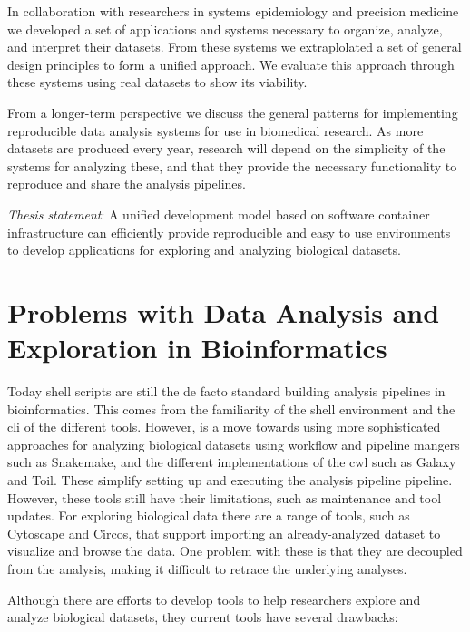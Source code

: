 In collaboration with researchers in systems epidemiology and precision
medicine we developed a set of applications and systems necessary to organize,
analyze, and interpret their datasets. From these systems we extraplolated a set
of general design principles to form a unified approach. We evaluate this
approach through these systems using real datasets to show its viability. 

From a longer-term perspective we discuss the general patterns for implementing
reproducible data analysis systems for use in biomedical research. As more
datasets are produced every year, research will depend on the simplicity of the
systems for analyzing these, and that they provide the necessary functionality
to reproduce and share the analysis pipelines. 

\emph{Thesis statement}:
A unified development model based on software container infrastructure can
efficiently provide reproducible and easy to use environments to develop
applications for exploring and analyzing biological datasets. 

\section{Problems with Data Analysis and Exploration in Bioinformatics}
Today shell scripts are still
the de facto standard building analysis pipelines in bioinformatics. This comes
from the familiarity of the shell environment and the \gls{cli} of the different
tools.  However, is a move towards using more sophisticated approaches for
analyzing biological datasets using workflow and pipeline mangers such as
Snakemake\cite{koster2012snakemake}, and the different implementations of the
\gls{cwl}\cite{cwl} such as Galaxy\cite{galaxy} and Toil\cite{toil}. These
simplify setting up and executing the analysis pipeline pipeline. However, these
tools still have their limitations, such as maintenance and tool updates.  For
exploring biological data there are a range of tools, such as
Cytoscape\cite{cytoscape} and Circos\cite{circos}, that support importing an
already-analyzed dataset to visualize and browse the data. One problem with
these is that they are decoupled from the analysis, making it difficult to
retrace the underlying analyses. 

Although there are efforts to develop tools to help researchers explore and
analyze biological datasets, they current tools have several drawbacks:

